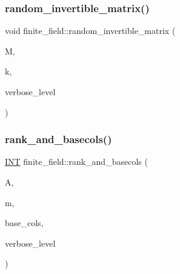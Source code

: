 \subsubsection{\texorpdfstring{random\+\_\+invertible\+\_\+matrix()}{random\_invertible\_matrix()}}
{\footnotesize\ttfamily void finite\+\_\+field\+::random\+\_\+invertible\+\_\+matrix (\begin{DoxyParamCaption}\item[{\mbox{\hyperlink{galois_8h_a09fddde158a3a20bd2dcadb609de11dc}{I\+NT}} $\ast$}]{M,  }\item[{\mbox{\hyperlink{galois_8h_a09fddde158a3a20bd2dcadb609de11dc}{I\+NT}}}]{k,  }\item[{\mbox{\hyperlink{galois_8h_a09fddde158a3a20bd2dcadb609de11dc}{I\+NT}}}]{verbose\+\_\+level }\end{DoxyParamCaption})}

\mbox{\label{classfinite__field_a47859ac426baa72547ac063440a9d02f}} 
\subsubsection{\texorpdfstring{rank\+\_\+and\+\_\+basecols()}{rank\_and\_basecols()}}
{\footnotesize\ttfamily \mbox{\hyperlink{galois_8h_a09fddde158a3a20bd2dcadb609de11dc}{I\+NT}} finite\+\_\+field\+::rank\+\_\+and\+\_\+basecols (\begin{DoxyParamCaption}\item[{\mbox{\hyperlink{galois_8h_a09fddde158a3a20bd2dcadb609de11dc}{I\+NT}} $\ast$}]{A,  }\item[{\mbox{\hyperlink{galois_8h_a09fddde158a3a20bd2dcadb609de11dc}{I\+NT}}}]{m,  }\item[{\mbox{\hyperlink{galois_8h_a09fddde158a3a20bd2dcadb609de11dc}{I\+NT}} $\ast$}]{base\+\_\+cols,  }\item[{\mbox{\hyperlink{galois_8h_a09fddde158a3a20bd2dcadb609de11dc}{I\+NT}}}]{verbose\+\_\+level }\end{DoxyParamCaption})}

\mbox{\label{classfinite__field_ab66d0dc9e1c186422ef4988283e41b6f}} 
